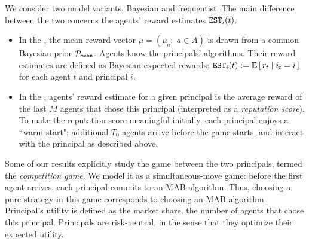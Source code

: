 
We consider two model variants, Bayesian and frequentist. The main difference between the two concerns the agents' reward estimates $\mathtt{EST}_i(t)$.

\begin{itemize}
\item In the \emph{\TheoryModel}, the mean reward vector $\mu = (\mu_a:\; a\in A)$ is drawn from a common Bayesian prior $\mathcal{P}_\mathtt{mean}$. Agents know the principals' algorithms. Their reward estimates are defined as Bayesian-expected rewards:
        $\est_i(t) := \E\sbr{ r_t\mid i_t = i }$
    for each agent $t$ and principal $i$.

\item In the \emph{\ExptsModel}, agents' reward estimate for a given principal is the average reward of the last $M$ agents that chose this principal (interpreted as a \emph{reputation score}). To make the reputation score meaningful initially, each principal enjoys a ``warm start": additional $T_0$ agents arrive before the game starts, and interact with the principal as described above.
     
\end{itemize}

Some of our results explicitly study the game between the two principals, termed the \emph{competition game}. We model it as a simultaneous-move game: before the first agent arrives, each principal commits to an MAB algorithm. Thus, choosing a pure strategy in this game corresponds to choosing an MAB algorithm. Principal's utility is defined as the market share, \ie the number of agents that chose this principal. Principals are risk-neutral, in the sense that they optimize their expected utility.


